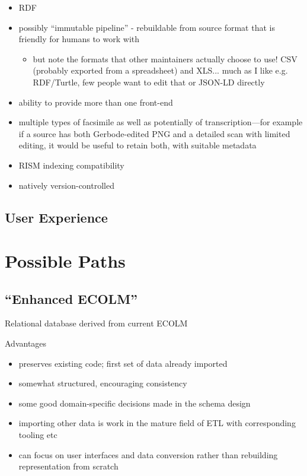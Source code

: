 \documentclass[sigconf, nonacm=true]{acmart}
\begin{document}
\begin{sloppypar}
  \begin{itemize}
  \item RDF
  \item possibly ``immutable pipeline'' - rebuildable from source
    format that is friendly for humans to work with
    \begin{itemize}
      \item but note the formats that other maintainers actually choose to
        use! CSV (probably exported from a spreadsheet) and
        XLS... much as I like e.g. RDF/Turtle, few people want to edit
        that or JSON-LD directly
    \end{itemize}
  \item ability to provide more than one front-end
  \item multiple types of facsimile as well as potentially of
    transcription---for example if a source has both Gerbode-edited
    PNG and a detailed scan with limited editing, it would be useful
    to retain both, with suitable metadata
  \item RISM indexing compatibility
  \item natively version-controlled
  \end{itemize}

  
  \subsection{User Experience}

  \section{Possible Paths}\label{future}

  \subsection{``Enhanced ECOLM''}

  Relational database derived from current ECOLM

  Advantages

  \begin{itemize}
  \item preserves existing code; first set of data already imported
  \item somewhat structured, encouraging consistency
  \item some good domain-specific decisions made in the schema design
  \item importing other data is work in the mature field of ETL with
    corresponding tooling etc
  \item can focus on user interfaces and data conversion rather than
    rebuilding representation from scratch
  \end{itemize}


\end{sloppypar}
\end{document}
